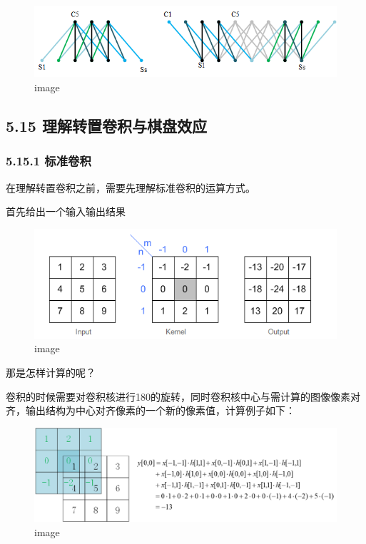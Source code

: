 \begin{figure}
\centering
\includegraphics{./img/ch5/5.14.1.png}
\caption{image}
\end{figure}

\subsection{5.15
理解转置卷积与棋盘效应}\label{ux7406ux89e3ux8f6cux7f6eux5377ux79efux4e0eux68cbux76d8ux6548ux5e94}

\subsubsection{5.15.1 标准卷积}\label{ux6807ux51c6ux5377ux79ef}

在理解转置卷积之前，需要先理解标准卷积的运算方式。

首先给出一个输入输出结果

\begin{figure}
\centering
\includegraphics{./img/ch5/img32.png}
\caption{image}
\end{figure}

那是怎样计算的呢？

卷积的时候需要对卷积核进行180的旋转，同时卷积核中心与需计算的图像像素对齐，输出结构为中心对齐像素的一个新的像素值，计算例子如下：

\begin{figure}
\centering
\includegraphics{./img/ch5/5.19.1-2.png}
\caption{image}
\end{figure}

